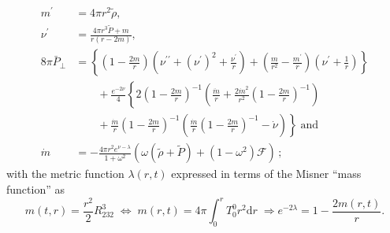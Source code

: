 \documentclass[notitlepage,letterpaper, 10pt]{article}
\begin{document}
\begin{align}
m^{\prime } &= 4 \pi r^{2}\tilde{\rho}, \label{EinsEq300}  \\
\nu^{\prime} & = \frac{4\pi r^{3}\tilde{P}+ m}{r(r-2m)}, \label{EinsEq311} \\
8\pi \bar{P}_{\perp} &= \left\{ \left( 1-\frac{2m}{r} \right) \left( \nu^{\prime \prime} + (\nu^{\prime})^{2}+ \frac{\nu^{\prime}}{r}  \right) + \left(  \frac{m}{r^{2}} -\frac{m^{\prime }}{r}  \right) \left( \nu^{\prime} + \frac{1}{r}     \right)   \right\} 
\nonumber \\ 
& \qquad  + \frac{e^{-2\nu}}{4} \left\{ 2\left(1 - \frac{2m}{r} \right)^{-1}
\left( \frac{\ddot{m}}{r} +\frac{2\dot{m}^2}{r^2} \left(1 - \frac{2m}{r} \right)^{-1}
\right)\right. \nonumber \\
& \qquad + \left.
\frac{\dot{m}}{r}\left(1 - \frac{2m}{r} \right)^{-1}
\left(\frac{\dot{m}}{r}\left(1 - \frac{2m}{r} \right)^{-1} -\dot{\nu}
\right)
\right\} \; \textrm{and} \label{EinsEq322} \\
\dot{m} &= -\frac{4 \pi r^{2} e^{\nu-\lambda}}{1+\omega^{2}}\left( \omega(\tilde{\rho}+ \tilde{P})+ (1-\omega^{2})\mathcal{F}     \right)  \label{EinsEq301}\, ;
\end{align}
with the metric function $\lambda(r,t)$ expressed in terms of the Misner ``mass function'' as \cite{HernandezMisner1966}
\begin{equation}
 m(t,r)=\frac{r^2}{2}R^{3}_{232} \; \Leftrightarrow \; m(r,t)=4\pi \int ^r_0 T^0_0r^2\mathrm{d}r \; \Rightarrow e^{-2\lambda}= 1-\frac{2 m(r,t)}{r}.
\label{MassDef} 
 \end{equation}
 
\end{document}

